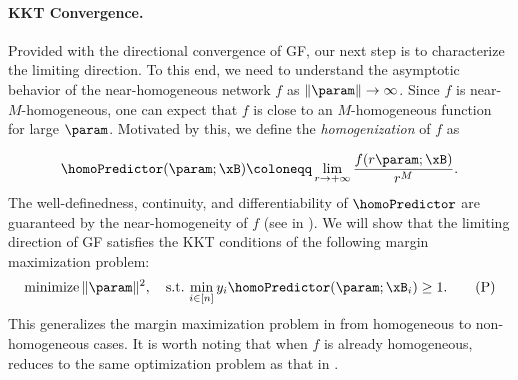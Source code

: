 
\paragraph{KKT Convergence.}
Provided with the directional convergence of GF,  
our next step is to characterize the limiting direction.
To this end, we need to understand the asymptotic behavior of the near-homogeneous network $f$ as $\|\param\| \to \infty$. 
Since $f$ is near-$M$-homogeneous, one can expect that $f$ is close to an $M$-homogeneous function for large $\param$. Motivated by this, we define the \emph{homogenization} of $f$ as 

\begin{equation}
\label{eq: homogenized f}
\homoPredictor (\param; \xB) \coloneqq \lim_{r \to +\infty} \frac{f(r \param; \xB)}{r^M}.
\end{equation}
The well-definedness, continuity, and differentiability of $\homoPredictor$ are guaranteed by the near-homogeneity of $f$ (see  in ). 
We will show that the limiting direction of GF satisfies the KKT conditions of the following margin maximization problem:
\begin{equation}
\label{eq: KKT}
    \mbox{minimize} \, \| \param\|^2, \quad \text{s.t.} \, \min_{i \in [n]} y_i \homoPredictor(\param;\xB_i) \ge 1. \tag{P}
\end{equation}
This generalizes the margin maximization problem in \citep{lyu2020gradient} from homogeneous to non-homogeneous cases.
It is worth noting that when $f$ is already homogeneous,  reduces to the same optimization problem as that in \citep{lyu2020gradient}.

